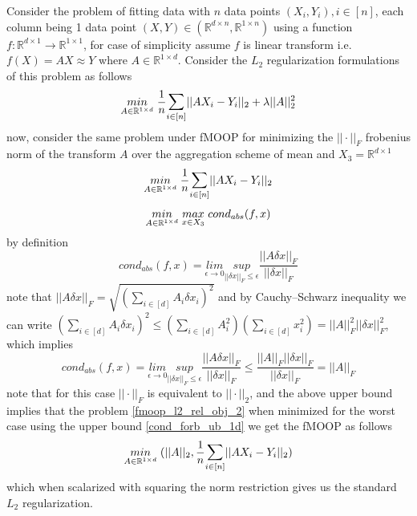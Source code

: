 Consider the problem of fitting data with $n$ data points $(X_i,Y_i), i \in [n]$, each column being 1 data point $(X,Y) \in (\mathbb{R}^{d\times n},\mathbb{R}^{1\times n})$ using a function $f:\mathbb{R}^{d\times 1}\to \mathbb{R}^{1\times 1}$, for case of simplicity assume $f$ is linear transform i.e. $f(X) = AX \approx Y$ where $A \in \mathbb{R}^{1\times d}$.
\newline Consider the $L_2$ regularization formulations of this problem as follows
\begin{equation} \label{l2_reg_prob_obj}
    \underset{A \in \mathbb{R}^{1\times d}}{min}\hspace{1mm} \frac{1}{n}\mathlarger{\sum}_{i\in [n]} ||AX_i-Y_i||_2 + \lambda ||A||^{2}_{2}
\end{equation}
now, consider the same problem under fMOOP for minimizing the $||\cdot||_{F}$ frobenius norm of the transform $A$ over the aggregation scheme of mean and $X_3 = \mathbb{R}^{d\times 1}$
\begin{equation} \label{fmoop_l2_rel_obj_1}
    \underset{A \in \mathbb{R}^{1\times d}}{min}\hspace{1mm} \frac{1}{n}\mathlarger{\sum}_{i\in [n]} ||AX_i-Y_i||_2
\end{equation}
\begin{equation} \label{fmoop_l2_rel_obj_2}
    \underset{A \in \mathbb{R}^{1\times d}}{min}\hspace{1mm} \underset{x \in X_3}{max}\hspace{1mm} cond_{abs}(f,x)
\end{equation}
by definition 
\begin{equation}
    cond_{abs}(f,x) = \underset{\epsilon \to 0}{lim}\underset{||\delta x||_F\le \epsilon}{sup} \frac{||A\delta x||_F}{||\delta x||_F}
\end{equation}
note that $||A\delta x||_F = \sqrt{(\sum_{i\in [d]} A_i\delta x_i)^2}$ and by Cauchy–Schwarz inequality we can write $(\sum_{i\in [d]} A_i\delta x_i)^2 \le (\sum_{i\in [d]} A^2_i)(\sum_{i\in [d]} x^2_i) =||A||^2_F||\delta x||^2_F $, which implies 
\begin{equation} \label{cond_forb_ub_1d}
    cond_{abs}(f,x) = \underset{\epsilon \to 0}{lim}\underset{||\delta x||_F\le \epsilon}{sup} \frac{||A\delta x||_F}{||\delta x||_F} \le \frac{||A||_F||\delta x||_F}{||\delta x||_F} = ||A||_F
\end{equation}
note that for this case $||\cdot||_F$ is equivalent to $||\cdot||_2$, and the above upper bound implies that the problem \ref{fmoop_l2_rel_obj_2} when minimized for the worst case using the upper bound \ref{cond_forb_ub_1d} we get the fMOOP as follows
\begin{equation} \label{fmoop_l2_rel_obj_new}
    \underset{A \in \mathbb{R}^{1\times d}}{min}\hspace{1mm} (||A||_2, \frac{1}{n}\mathlarger{\sum}_{i\in [n]} ||AX_i-Y_i||_2)
\end{equation}
which when scalarized with squaring the norm restriction gives us the standard $L_2$ regularization.

